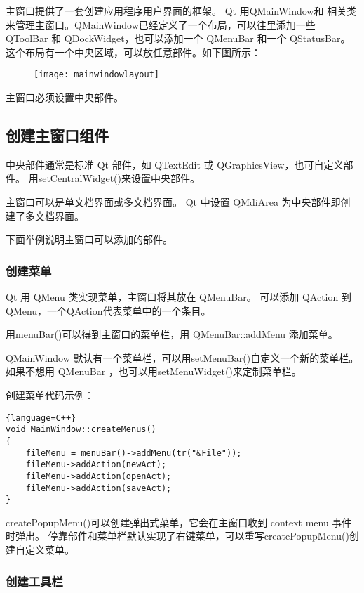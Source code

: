 主窗口提供了一套创建应用程序用户界面的框架。 Qt 用QMainWindow和 相关类 来管理主窗口。QMainWindow已经定义了一个布局，可以往里添加一些 QToolBar 和 QDockWidget，也可以添加一个 QMenuBar 和一个 QStatusBar。这个布局有一个中央区域，可以放任意部件。如下图所示：

\begin{figure}[hbt!]  
	\centering
    \texttt{[image: mainwindowlayout]}
\end{figure}

\begin{notice}
主窗口必须设置中央部件。
\end{notice}

\subsection{创建主窗口组件}

中央部件通常是标准 Qt 部件，如 QTextEdit 或 QGraphicsView，也可自定义部件。
用setCentralWidget()来设置中央部件。

主窗口可以是单文档界面或多文档界面。 
Qt 中设置 QMdiArea 为中央部件即创建了多文档界面。

下面举例说明主窗口可以添加的部件。

\subsubsection{创建菜单}

Qt 用 QMenu 类实现菜单，主窗口将其放在 QMenuBar。
可以添加 QAction 到QMenu，一个QAction代表菜单中的一个条目。

用menuBar()可以得到主窗口的菜单栏，用 QMenuBar::addMenu 添加菜单。

QMainWindow 默认有一个菜单栏，可以用setMenuBar()自定义一个新的菜单栏。
如果不想用 QMenuBar ，也可以用setMenuWidget()来定制菜单栏。

创建菜单代码示例：

\begin{lstlisting}{language=C++}
void MainWindow::createMenus()
{
    fileMenu = menuBar()->addMenu(tr("&File"));
    fileMenu->addAction(newAct);
    fileMenu->addAction(openAct);
    fileMenu->addAction(saveAct);
}
\end{lstlisting}

createPopupMenu()可以创建弹出式菜单，它会在主窗口收到 context menu 事件时弹出。
停靠部件和菜单栏默认实现了右键菜单，可以重写createPopupMenu()创建自定义菜单。

\subsubsection{创建工具栏}

